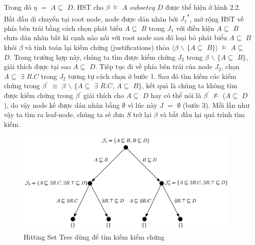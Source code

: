 Trong đó $\eta$ $=$ $A\subseteq$ $D$. HST cho $\beta$ $\models$ $A$ $subseteq$ $D$ được thể hiện ở hình 2.2. Bắt đầu di chuyển tại root node, node được dán nhãn bởi $J_{1}$\textsuperscript{*}, mở rộng HST về phía bên trái bằng cách chọn phát biểu $A\subseteq$ $B$ trong $J_{1}$ với điều kiện $A\subseteq$ $B$ chưa dán nhãn bất kì cạnh nào nối với root node sau đó loại bỏ phát biểu $A\subseteq$ $B$ khỏi $\beta$ và tính toán lại kiếm chứng (justifications) thỏa $\langle\beta$ $\backslash$ $\{A\subseteq$ $B\}\rangle$ $\models$ $A\subseteq$ $D$. Trong trường hợp này, chúng ta tìm được kiểm chứng $J_{2}$ trong $\beta$ $\backslash$ $\{A\subseteq$ $B\}$, giải thích được tại sao $A\subseteq$ $D$. Tiếp tục đi về phía bên trái của node $J_{2}$, chọn $A\subseteq$ $\exists$ $R.C$ trong $J_{2}$ tương tự cách chọn ở bước 1. Sau đó tìm kiếm các kiểm chứng trong $\beta^{'}$ $\equiv$ $\beta$ $\backslash$ $\{A\subseteq$ $\exists$ $R.C$, $A\subseteq$ $B\}$, kết quả là chúng ta không tìm được kiểm chứng trong $\beta^{'}$ giải thích cho $A\subseteq$ $D$ hay có thể nói là $\beta^{'}$ $\not\models$ ($A\subseteq$ $D$), do vậy node kế được dán nhãn bằng $\emptyset$ vì lúc này $J$ $=$ $\emptyset$ (bước 3). Mỗi lần như vậy ta tìm ra leaf-node, chúng ta sẽ đưa $S$ trở lại $\beta$ và bắt đầu lại quá trình tìm kiếm.
		\begin{figure}[ht!]
			\centering
			\includegraphics[width=110mm]{Figures/fig2.png}
			\caption{Hitting Set Tree dùng để tìm kiếm kiểm chứng \label{overflow}}
		\end{figure}
